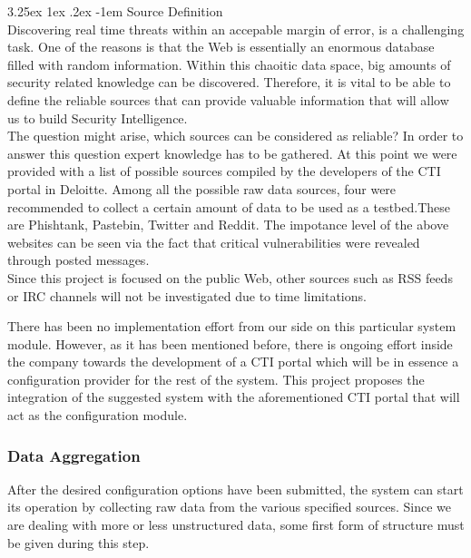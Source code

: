 \documentclass[12pt]{article}
\makeatletter
\newcounter{subsubsubsection}[subsubsection]
\renewcommand\paragraph{\@startsection{paragraph}{5}{\z@}%
  {3.25ex \@plus1ex \@minus.2ex}%
  {-1em}%
  {\normalfont\normalsize\bfseries}}
\makeatother
\begin{document}
\paragraph{Source Definition}
\hfill \break \\
Discovering real time threats within an accepable margin of error, is a challenging task. One of the reasons is that the Web is essentially an enormous database filled with random information. Within this chaoitic data space, big amounts of security related knowledge can be discovered. Therefore, it is vital to be able to define the reliable sources that can provide valuable information that will allow us to build Security Intelligence. 
\hfill \break \\
The question might arise, which sources can be considered as reliable? In order to answer this question expert knowledge has to be gathered. At this point we were provided with a list of possible sources compiled by the developers of the CTI portal in Deloitte. Among all the possible raw data sources, four were recommended to collect a certain amount of data to be used as a testbed.These are Phishtank, Pastebin, Twitter and Reddit. The impotance level of the above websites can be seen via the fact that critical vulnerabilities were revealed through posted messages\cite{list-2015-attacks}.\\

Since this project is focused on the public Web, other sources such as RSS feeds or IRC channels will not be investigated due to time limitations.   

There has been no implementation effort from our side on this particular system module. However, as it has been mentioned before, there is ongoing effort inside the company towards the development of a CTI portal which will be in essence a configuration provider for the rest of the system. This project proposes the integration of the suggested system with the aforementioned CTI portal that will act as the configuration module. 


\subsubsection{Data Aggregation}

After the desired configuration options have been submitted, the  system can start its operation by collecting raw data from the various specified sources. Since we are dealing with more or less unstructured data, some first form of structure must be given during this step.
\end{document}
